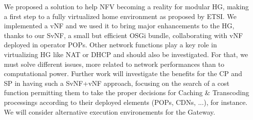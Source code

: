We proposed a solution to help NFV becoming a reality for modular HG, making a first step to a fully virtualized home environment as proposed by ETSI.
We implemented a vNF and we used it to bring major enhancements to the HG, thanks to our SvNF, a small but efficient OSGi bundle, collaborating with vNF deployed in operator POPs.
Other network functions play a key role in virtualizing HG like NAT or DHCP and should also be investigated.
For that, we must solve different issues, more related to network performances than to computational power. 
Further work will investigate the benefits for the CP and SP in having such a SvNF+vNF approach, focusing on the search of a cost function permitting them to take the proper decisions for Caching \& Transcoding processings according to their deployed elements (POPs, CDNs, ...), for instance. 
We will consider alternative execution environements for the Gateway.


